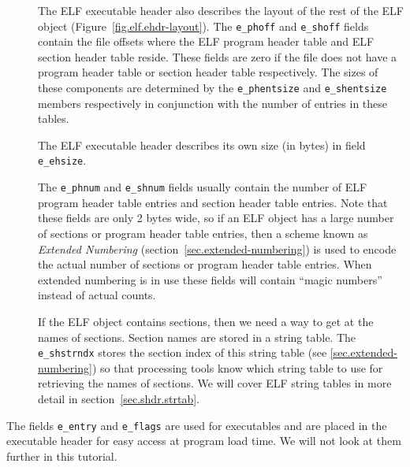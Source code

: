 \documentclass[a4paper,pdftex]{book}
\makeatletter
\newcommand{\firstterm}[1]{\textit{#1}}
\newcommand{\parameter}[1]{\texttt{#1}}
\newenvironment{callout}[2][black]{%
  \begingroup\newcommand{\@cocolor}{#1}%
  \setlength{\shadowsize}{1.2pt}%
  \newcommand{\@cogroup}[1]{#2}}{\endgroup}
\newcommand{\@co}[1]{\shadowbox{\color{\@cocolor}#1}}
\newcommand{\coref}[1]{%
  \hypertarget{\@cogroup.#1.cr}{%
    \hyperlink{\@cogroup.#1.co}{\@co{#1}}}}
\makeatother
\begin{document}
\begin{callout}{ehdr}
\begin{description}
  \item[\coref{4} \coref{5}] The ELF executable header also describes
    the layout of the rest of the ELF object
    (Figure~\vref{fig.elf.ehdr-layout}). The \parameter{e\_phoff} and
    \parameter{e\_shoff} fields contain the file offsets where the ELF
    program header table and ELF section header table reside.
    These fields are zero if the file does not have a program header
    table or section header table respectively.  The sizes of these
    components are determined by the \parameter{e\_phentsize} and
    \parameter{e\_shentsize} members respectively in conjunction with
    the number of entries in these tables.%

    The ELF executable header describes its own size (in bytes) in
    field \parameter{e\_ehsize}.%

  \item[\coref{6} \coref{7}] The \parameter{e\_phnum} and
    \parameter{e\_shnum} fields usually contain the number of ELF
    program header table entries and section header table entries.
    Note that these fields are only 2 bytes wide, so if an ELF object
    has a large number of sections or program header table entries,
    then a scheme known as \firstterm{Extended Numbering}%
     (section~\vref{sec.extended-numbering})
    is used to encode the actual number of sections or program header
    table entries.  When extended numbering is in use these fields
    will contain ``magic numbers'' instead of actual counts.

  \item[\coref{8}] If the ELF object contains sections, then we need a
    way to get at the names of sections.  Section names are stored in
    a string table. The \parameter{e\_shstrndx} stores the section
    index of this string table (see \vref{sec.extended-numbering}) so
    that processing tools know which string table to use for
    retrieving the names of sections.  We will cover ELF string tables
    in more detail in section~\vref{sec.shdr.strtab}.%
  \end{description}

  The fields \parameter{e\_entry} and \parameter{e\_flags} are used
  for executables and are placed in the executable header for easy
  access at program load time.  We will not look at them further in
  this tutorial.%
\end{callout}
\end{document}
